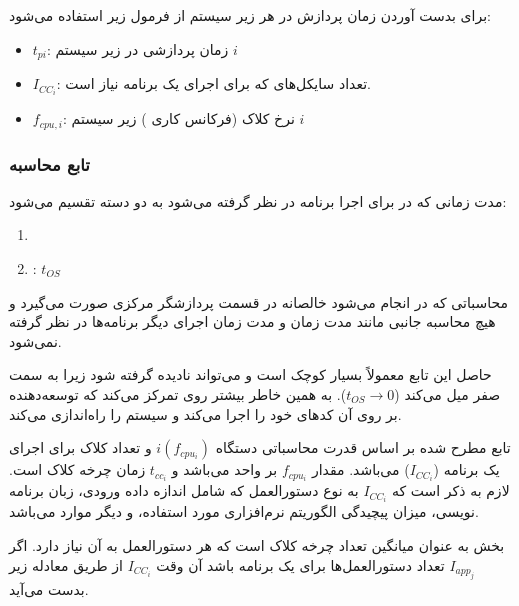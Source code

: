 \documentclass[a4paper]{article}
\begin{document}
برای بدست آوردن زمان پردازش در هر زیر سیستم از فرمول زیر استفاده می‌شود:


\begin{itemize}
    \item $t_{pi}$: زمان پردازشی در زیر سیستم $i$
    \item $I_{CC_i}$: تعداد سایکل‌های  که برای اجرای یک برنامه نیاز است.
    \item $f_{cpu, i}$: نرخ کلاک (فرکانس کاری ) زیر سیستم $i$
\end{itemize}


\subsubsection{تابع محاسبه }

مدت زمانی که در  برای اجرا برنامه در نظر گرفته می‌شود به دو دسته تقسیم می‌شود:

\begin{enumerate}
    \item {}
    \item {}: $t_{OS}$
\end{enumerate}

محاسباتی که در  انجام می‌شود خالصانه در قسمت پردازشگر مرکزی صورت
می‌گیرد و هیچ محاسبه جانبی مانند مدت زمان  و مدت زمان اجرای دیگر
برنامه‌ها در نظر گرفته نمی‌شود.


حاصل این تابع معمولاً بسیار کوچک است و می‌تواند نادیده گرفته شود زیرا به سمت صفر
میل می‌کند ($t_{OS} \rightarrow 0$). به همین خاطر بیشتر روی 
تمرکز می‌کند که توسعه‌دهنده بر روی آن کد‌های خود را اجرا می‌کند و سیستم 
را راه‌اندازی می‌کند.

تابع مطرح شده بر اساس قدرت محاسباتی دستگاه $i(f_{cpu_i})$ و تعداد کلاک 
برای اجرای یک برنامه ($I_{CC_i}$) می‌باشد. مقدار $f_{cpu_i}$ بر واحد 
می‌باشد و $t_{cc_i}$ زمان چرخه کلاک است. لازم به ذکر است که $I_{CC_i}$ به نوع
دستورالعمل که شامل اندازه داده ورودی، زبان برنامه نویسی، میزان پیچیدگی الگوریتم
نرم‌افزاری مورد استفاده، و دیگر موارد می‌باشد.

بخش  به عنوان میانگین تعداد چرخه کلاک است
که هر دستورالعمل به آن نیاز دارد. اگر $I_{app_j}$ تعداد دستورالعمل‌ها برای یک
برنامه باشد آن وقت $I_{CC_i}$ از طریق معادله زیر بدست می‌آید.
\end{document}
